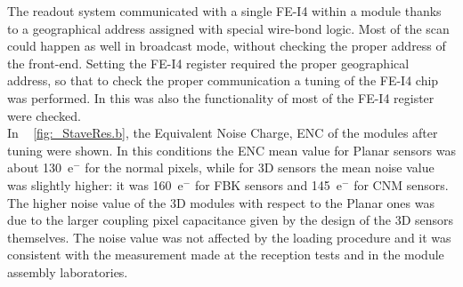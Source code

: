 The readout system communicated with a single FE-I4 within a module thanks to a geographical address assigned with special wire-bond logic. Most of the scan could happen as well in broadcast mode, without checking the proper address of the front-end. Setting the FE-I4 register required the proper geographical address, so that to check the proper communication a tuning of the FE-I4 chip was performed. In this was also the functionality of most of the FE-I4 register were checked. \cite{FEI4}\\
In ~ \ref{fig:_StaveRes.b}, the Equivalent Noise Charge, ENC of the modules after tuning were shown. In this conditions the ENC mean value for Planar  sensors was about 130~e$^-$ for the normal pixels, while for 3D sensors the mean noise value was slightly higher: it was 160~e$^-$ for FBK sensors and 145~e$^-$ for CNM sensors. The higher noise value of the 3D modules with respect to the Planar  ones was due to the larger coupling pixel capacitance given by the design of the 3D sensors themselves. 
The noise value was not affected by the loading procedure and it was consistent with the measurement made at the reception tests and in the module assembly laboratories.
